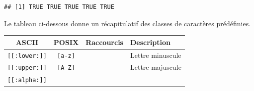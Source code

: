\documentclass[
  11pt,
]{book}
\numberwithin{equation}{section}
\numberwithin{countremarque}{section}
\begin{document}
\begin{lstlisting}
## [1] TRUE TRUE TRUE TRUE TRUE
\end{lstlisting}

Le tableau ci-dessous donne un récapitulatif des classes de caractères prédéfinies.

\begin{longtable}[]{@{}cccl@{}}
\toprule
\begin{minipage}[b]{0.17\columnwidth}\centering
ASCII\strut
\end{minipage} & \begin{minipage}[b]{0.21\columnwidth}\centering
POSIX\strut
\end{minipage} & \begin{minipage}[b]{0.21\columnwidth}\centering
Raccourcis\strut
\end{minipage} & \begin{minipage}[b]{0.29\columnwidth}\raggedright
Description\strut
\end{minipage}\tabularnewline
\midrule
\endhead
\begin{minipage}[t]{0.17\columnwidth}\centering
\texttt{{[}{[}:lower:{]}{]}}\strut
\end{minipage} & \begin{minipage}[t]{0.21\columnwidth}\centering
\texttt{{[}a-z{]}}\strut
\end{minipage} & \begin{minipage}[t]{0.21\columnwidth}\centering
\strut
\end{minipage} & \begin{minipage}[t]{0.29\columnwidth}\raggedright
Lettre minuscule\strut
\end{minipage}\tabularnewline
\begin{minipage}[t]{0.17\columnwidth}\centering
\texttt{{[}{[}:upper:{]}{]}}\strut
\end{minipage} & \begin{minipage}[t]{0.21\columnwidth}\centering
\texttt{{[}A-Z{]}}\strut
\end{minipage} & \begin{minipage}[t]{0.21\columnwidth}\centering
\strut
\end{minipage} & \begin{minipage}[t]{0.29\columnwidth}\raggedright
Lettre majuscule\strut
\end{minipage}\tabularnewline
\begin{minipage}[t]{0.17\columnwidth}\centering
\texttt{{[}{[}:alpha:{]}{]}}\strut
\end{minipage} & \begin{minipage}[t]{0.21\columnwidth}\centering

\end{minipage}
\end{longtable}
\end{document}
